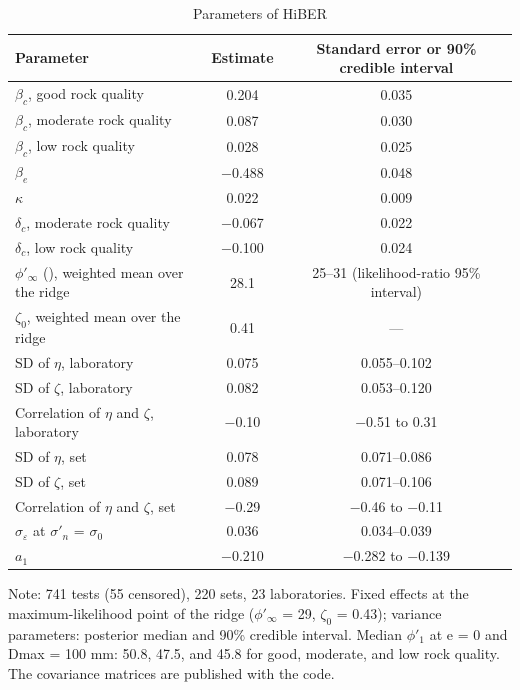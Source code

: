 \documentclass[Journal,letterpaper]{ascelike-new}
\begin{document}
\begin{table}
\caption{Parameters of HiBER}
\label{tab:1}
\centering\footnotesize
\renewcommand{\arraystretch}{1.15}
\setlength{\tabcolsep}{3pt}
\begin{tabular}{lcc}
\hline
Parameter & Estimate & Standard error or 90\% credible interval \\
\hline
$\beta_c$, good rock quality & 0.204 & 0.035 \\
$\beta_c$, moderate rock quality & 0.087 & 0.030 \\
$\beta_c$, low rock quality & 0.028 & 0.025 \\
$\beta_e$ & $-$0.488 & 0.048 \\
$\kappa$ & 0.022 & 0.009 \\
$\delta_c$, moderate rock quality & $-$0.067 & 0.022 \\
$\delta_c$, low rock quality & $-$0.100 & 0.024 \\
$\phi'_\infty$ (\textdegree{}), weighted mean over the ridge & 28.1 & 25--31 (likelihood-ratio 95\% interval) \\
$\zeta_0$, weighted mean over the ridge & 0.41 & --- \\
SD of $\eta$, laboratory & 0.075 & 0.055--0.102 \\
SD of $\zeta$, laboratory & 0.082 & 0.053--0.120 \\
Correlation of $\eta$ and $\zeta$, laboratory & $-$0.10 & $-$0.51 to 0.31 \\
SD of $\eta$, set & 0.078 & 0.071--0.086 \\
SD of $\zeta$, set & 0.089 & 0.071--0.106 \\
Correlation of $\eta$ and $\zeta$, set & $-$0.29 & $-$0.46 to $-$0.11 \\
$\sigma_\varepsilon$ at $\sigma'_n$ = $\sigma_0$ & 0.036 & 0.034--0.039 \\
$a_1$ & $-$0.210 & $-$0.282 to $-$0.139 \\
\hline
\end{tabular}
\par\vspace{4pt}\parbox{\linewidth}{\footnotesize Note: 741 tests (55 censored), 220 sets, 23 laboratories. Fixed effects at the maximum-likelihood point of the ridge ($\phi'_\infty$ = 29\textdegree{}, $\zeta_0$ = 0.43); variance parameters: posterior median and 90\% credible interval. Median $\phi'_1$ at e = 0 and Dmax = 100 mm: 50.8\textdegree{}, 47.5\textdegree{}, and 45.8\textdegree{} for good, moderate, and low rock quality. The covariance matrices are published with the code.}
\end{table}
\end{document}
